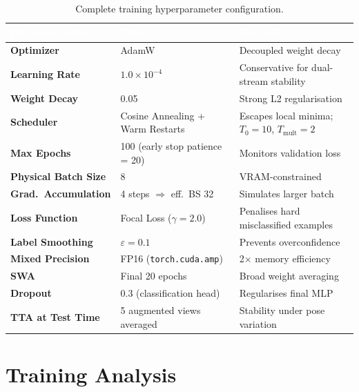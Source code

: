 \documentclass[12pt, a4paper]{article}
\begin{document}
\begin{table}[H]
\centering
\caption{Complete training hyperparameter configuration.}
\label{tab:training}
\begin{tabularx}{\textwidth}{>{\bfseries}lXX}
\toprule
\rowcolor{NavyBlue}
\textcolor{white}{Hyperparameter} &
\textcolor{white}{Value} &
\textcolor{white}{Rationale} \\
\midrule
Optimizer           & AdamW                          & Decoupled weight decay \\
Learning Rate       & $1.0\times10^{-4}$             & Conservative for dual-stream stability \\
Weight Decay        & 0.05                           & Strong L2 regularisation \\
Scheduler           & Cosine Annealing + Warm Restarts & Escapes local minima; $T_0=10$, $T_\text{mult}=2$ \\
Max Epochs          & 100 (early stop patience = 20) & Monitors validation loss \\
Physical Batch Size & 8                              & VRAM-constrained \\
Grad.\ Accumulation & 4 steps $\Rightarrow$ eff.\ BS 32 & Simulates larger batch \\
Loss Function       & Focal Loss ($\gamma=2.0$)      & Penalises hard misclassified examples \\
Label Smoothing     & $\varepsilon=0.1$              & Prevents overconfidence \\
Mixed Precision     & FP16 (\texttt{torch.cuda.amp}) & 2$\times$ memory efficiency \\
SWA                 & Final 20 epochs                & Broad weight averaging \\
Dropout             & 0.3 (classification head)      & Regularises final MLP \\
TTA at Test Time    & 5 augmented views averaged     & Stability under pose variation \\
\bottomrule
\end{tabularx}
\end{table}

\section{Training Analysis}
\end{document}

